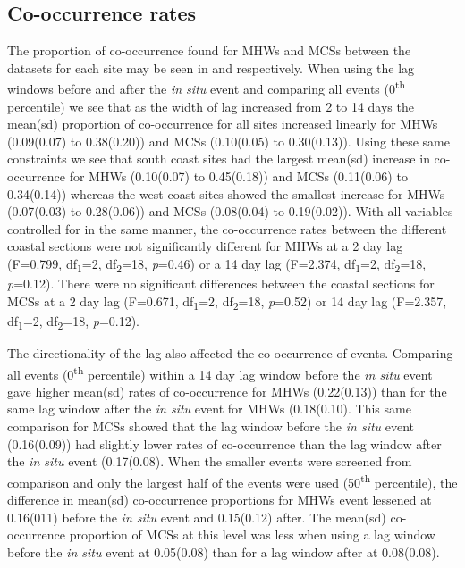 \documentclass[a4paper,10pt,review]{elsarticle}
\begin{document}
\subsection{Co-occurrence rates}
The proportion of co-occurrence found for MHWs and MCSs between the datasets for each site may be seen in  and  respectively. When using the lag windows before and after the \emph{in situ} event and comparing all events (0\textsuperscript{th} percentile) we see that as the width of lag increased from 2 to 14 days the mean(sd) proportion of co-occurrence for all sites increased linearly for MHWs (0.09(0.07) to 0.38(0.20)) and MCSs (0.10(0.05) to 0.30(0.13)). Using these same constraints we see that south coast sites had the largest mean(sd) increase in co-occurrence for MHWs (0.10(0.07) to 0.45(0.18)) and MCSs (0.11(0.06) to 0.34(0.14)) whereas the west coast sites showed the smallest increase for MHWs (0.07(0.03) to 0.28(0.06)) and MCSs (0.08(0.04) to 0.19(0.02)). With all variables controlled for in the same manner, the co-occurrence rates between the different coastal sections were not significantly different for MHWs at a 2 day lag (F=0.799, df\textsubscript{1}=2, df\textsubscript{2}=18, \emph{p}=0.46) or a 14 day lag (F=2.374, df\textsubscript{1}=2, df\textsubscript{2}=18, \emph{p}=0.12). There were no significant differences between the coastal sections for MCSs at a 2 day lag (F=0.671, df\textsubscript{1}=2, df\textsubscript{2}=18, \emph{p}=0.52) or 14 day lag (F=2.357, df\textsubscript{1}=2, df\textsubscript{2}=18, \emph{p}=0.12).

The directionality of the lag also affected the co-occurrence of events. Comparing all events (0\textsuperscript{th} percentile) within a 14 day lag window before the \emph{in situ} event gave higher mean(sd) rates of co-occurrence for MHWs (0.22(0.13)) than for the same lag window after the \emph{in situ} event for MHWs (0.18(0.10). This same comparison for MCSs showed that the lag window before the \emph{in situ} event (0.16(0.09)) had slightly lower rates of co-occurrence than the lag window after the \emph{in situ} event (0.17(0.08). When the smaller events were screened from comparison and only the largest half of the events were used (50\textsuperscript{th} percentile), the difference in mean(sd) co-occurrence proportions for MHWs event lessened at 0.16(011) before the \emph{in situ} event and 0.15(0.12) after. The mean(sd) co-occurrence proportion of MCSs at this level was less when using a lag window before the \emph{in situ} event at 0.05(0.08) than for a lag window after at 0.08(0.08).
\end{document}
